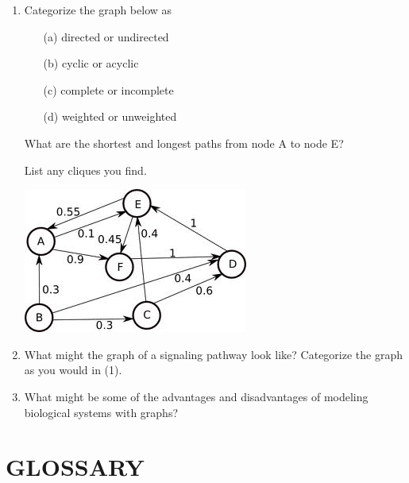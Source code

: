 \documentclass[11pt]{article}
\begin{document}
\begin{enumerate}
\item Categorize the graph below as 
  \begin{itemize}
  \item[(a)] directed or undirected
  \item [(b)] cyclic or acyclic
  \item [(c)] complete or incomplete
  \item [(d)] weighted or unweighted
  \end{itemize}
  What are the shortest and longest paths from node A to node E?  
  
  List any cliques you find.

  \includegraphics[scale=0.5]{q1.png}

\item What might the graph of a signaling pathway look like?  
  Categorize the graph as you would in (1).

\item What might be some of the advantages and disadvantages of modeling biological systems with graphs?
\end{enumerate}


\section*{GLOSSARY}
\end{document}
